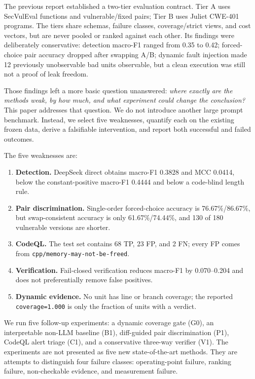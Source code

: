 \documentclass[conference]{IEEEtran}
\begin{document}
The previous report established a two-tier evaluation contract. Tier A uses SecVulEval functions and vulnerable/fixed pairs; Tier B uses Juliet CWE-401 programs. The tiers share schemas, failure classes, coverage/strict views, and cost vectors, but are never pooled or ranked against each other. Its findings were deliberately conservative: detection macro-F1 ranged from 0.35 to 0.42; forced-choice pair accuracy dropped after swapping A/B; dynamic fault injection made 12 previously unobservable bad units observable, but a clean execution was still not a proof of leak freedom.

Those findings left a more basic question unanswered: \emph{where exactly are the methods weak, by how much, and what experiment could change the conclusion?} This paper addresses that question. We do not introduce another large prompt benchmark. Instead, we select five weaknesses, quantify each on the existing frozen data, derive a falsifiable intervention, and report both successful and failed outcomes.

The five weaknesses are:
\begin{enumerate}
  \item \textbf{Detection.} DeepSeek direct obtains macro-F1 0.3828 and MCC 0.0414, below the constant-positive macro-F1 0.4444 and below a code-blind length rule.
  \item \textbf{Pair discrimination.} Single-order forced-choice accuracy is 76.67\%/86.67\%, but swap-consistent accuracy is only 61.67\%/74.44\%, and 130 of 180 vulnerable versions are shorter.
  \item \textbf{CodeQL.} The test set contains 68 TP, 23 FP, and 2 FN; every FP comes from \texttt{cpp/memory-may-not-be-freed}.
  \item \textbf{Verification.} Fail-closed verification reduces macro-F1 by 0.070--0.204 and does not preferentially remove false positives.
  \item \textbf{Dynamic evidence.} No unit has line or branch coverage; the reported \texttt{coverage=1.000} is only the fraction of units with a verdict.
\end{enumerate}

We run five follow-up experiments: a dynamic coverage gate (G0), an interpretable non-LLM baseline (B1), diff-guided pair discrimination (P1), CodeQL alert triage (C1), and a conservative three-way verifier (V1). The experiments are not presented as five new state-of-the-art methods. They are attempts to distinguish four failure classes: operating-point failure, ranking failure, non-checkable evidence, and measurement failure.
\end{document}
